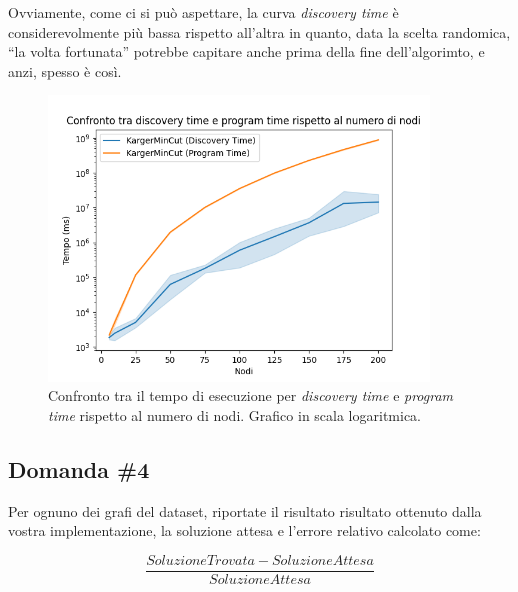 \noindent Ovviamente, come ci si può aspettare, la curva
\emph{discovery time} è considerevolmente più bassa rispetto all'altra
in quanto, data la scelta randomica, ``la volta fortunata'' potrebbe
capitare anche prima della fine dell'algorimto, e anzi, spesso è così.

\begin{figure}[H]
    \centering

    \includegraphics[width=0.9\textwidth]{./images/Confronto_tra_discovery_time_e_program_time_rispetto_al_numero_di_nodi.png}

    \caption{Confronto tra il tempo di esecuzione per \emph{discovery time} e \emph{program time} rispetto al numero di nodi. Grafico in scala logaritmica.}
    \label{fig:karger-discovery-vs-program-time-chart}
\end{figure}

\subsection{Domanda \#4}
\label{sec:question-4}

\begin{displayquote}
Per ognuno dei grafi del dataset, riportate il risultato risultato ottenuto dalla vostra implementazione, la soluzione attesa e l'errore relativo calcolato come:

\begin{equation*}
    \frac{SoluzioneTrovata - SoluzioneAttesa}{SoluzioneAttesa}
\end{equation*}

\end{displayquote}
